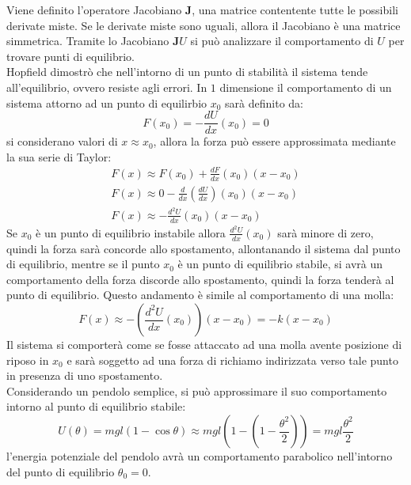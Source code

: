 \documentclass{article}
\numberwithin{equation}{subsection}
\begin{document}
Viene definito l'operatore Jacobiano $\mathbf{J}$, una matrice contentente tutte 
le possibili derivate miste. Se le derivate miste sono uguali, 
allora il Jacobiano è una matrice simmetrica. Tramite lo 
Jacobiano $\mathbf{J}U$ si può analizzare il comportamento di $U$ 
per trovare punti di equilibrio.
\\
Hopfield dimostrò che nell'intorno di un punto di stabilità 
il sistema tende all'equilibrio, ovvero resiste agli errori. 
In $1$ dimensione il comportamento di un sistema attorno ad un 
punto di equilirbio $x_0$ sarà definito da:
\begin{equation}
    F(x_0)=-\displaystyle\frac{dU}{dx}(x_0)=0
\end{equation}
si considerano valori di $x\approx x_0$, allora la forza può 
essere approssimata mediante la sua serie di Taylor:
\begin{gather*}
    F(x)\approx F(x_0)+\displaystyle\frac{dF}{dx}(x_0)(x-x_0)\\
    F(x)\approx 0-\displaystyle\frac{d}{dx}\left(\frac{dU}{dx}\right)(x_0)(x-x_0)\\
    F(x)\approx -\displaystyle\frac{d^{2}U}{dx}(x_0)(x-x_0)
\end{gather*}
Se $x_0$ è un punto di equilibrio instabile allora $\displaystyle\frac{d^{2}U}{dx}(x_0)$ 
sarà minore di zero, quindi la forza sarà concorde allo 
spostamento, allontanando il sistema dal punto di equilibrio, mentre 
se il punto $x_0$ è un punto di equilibrio stabile, si avrà 
un comportamento della forza discorde allo spostamento, quindi 
la forza tenderà al punto di equilibrio. Questo andamento  
è simile al comportamento di una molla:
\begin{equation}
    F(x)\approx -\left(\displaystyle\frac{d^{2}U}{dx}(x_0)\right)(x-x_0)=-k(x-x_0)
\end{equation}
Il sistema si comporterà come se fosse attaccato ad una molla avente 
posizione di riposo in $x_0$ e sarà soggetto ad una forza di 
richiamo indirizzata verso tale punto in presenza di uno 
spostamento. 
\\
Considerando un pendolo semplice, si può approssimare il suo comportamento intorno al punto di equilibrio stabile: 
\begin{equation*}
    U(\theta) = mgl(1-\cos\theta)\approx mgl\left(1-\left(1-\displaystyle\frac{\theta^{2}}{2}\right)\right)=mgl\frac{\theta^2}{2}
\end{equation*}
l'energia potenziale del pendolo avrà un comportamento parabolico 
nell'intorno del punto di equilibrio $\theta_0=0$.
\end{document}
